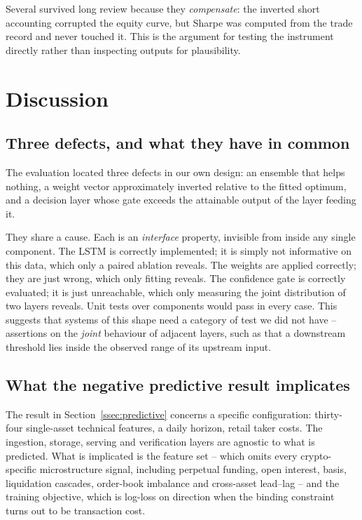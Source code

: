 \documentclass[preprint,12pt,authoryear]{elsarticle}
\begin{document}
Several survived long review because they \emph{compensate}: the inverted short
accounting corrupted the equity curve, but Sharpe was computed from the trade
record and never touched it. This is the argument for testing the instrument
directly rather than inspecting outputs for plausibility.

\section{Discussion}
\label{sec:discussion}

\subsection{Three defects, and what they have in common}

The evaluation located three defects in our own design: an ensemble that helps
nothing, a weight vector approximately inverted relative to the fitted optimum,
and a decision layer whose gate exceeds the attainable output of the layer
feeding it.

They share a cause. Each is an \emph{interface} property, invisible from inside
any single component. The LSTM is correctly implemented; it is simply not
informative on this data, which only a paired ablation reveals. The weights are
applied correctly; they are just wrong, which only fitting reveals. The
confidence gate is correctly evaluated; it is just unreachable, which only
measuring the joint distribution of two layers reveals. Unit tests over
components would pass in every case. This suggests that systems of this shape
need a category of test we did not have -- assertions on the \emph{joint}
behaviour of adjacent layers, such as that a downstream threshold lies inside the
observed range of its upstream input.

\subsection{What the negative predictive result implicates}

The result in Section~\ref{ssec:predictive} concerns a specific configuration:
thirty-four single-asset technical features, a daily horizon, retail taker costs.
The ingestion, storage, serving and verification layers are agnostic to what is
predicted. What is implicated is the feature set -- which omits every
crypto-specific microstructure signal, including perpetual funding, open
interest, basis, liquidation cascades, order-book imbalance and cross-asset
lead--lag -- and the training objective, which is log-loss on direction when the
binding constraint turns out to be transaction cost.
\end{document}
